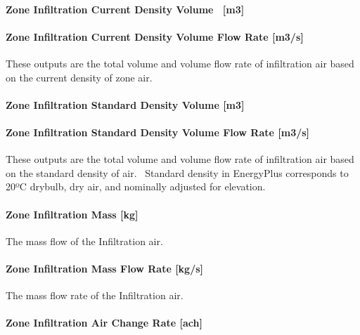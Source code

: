 \paragraph{Zone Infiltration Current Density Volume~ {[}m3{]}}\label{zone-infiltration-current-density-volume-m3}

\paragraph{Zone Infiltration Current Density Volume Flow Rate {[}m3/s{]}}\label{zone-infiltration-current-density-volume-flow-rate-m3s}

These outputs are the total volume and volume flow rate of infiltration air based on the current density of zone air.

\paragraph{Zone Infiltration Standard Density Volume {[}m3{]}}\label{zone-infiltration-standard-density-volume-m3}

\paragraph{Zone Infiltration Standard Density Volume Flow Rate {[}m3/s{]}}\label{zone-infiltration-standard-density-volume-flow-rate-m3s}

These outputs are the total volume and volume flow rate of infiltration air based on the standard density of air.~ Standard density in EnergyPlus corresponds to 20ºC drybulb, dry air, and nominally adjusted for elevation.

\paragraph{Zone Infiltration Mass {[}kg{]}}\label{zone-infiltration-mass-kg}

The mass flow of the Infiltration air.

\paragraph{Zone Infiltration Mass Flow Rate {[}kg/s{]}}\label{zone-infiltration-mass-flow-rate-kgs}

The mass flow rate of the Infiltration air.

\paragraph{Zone Infiltration Air Change Rate {[}ach{]}}\label{zone-infiltration-air-change-rate-ach}

